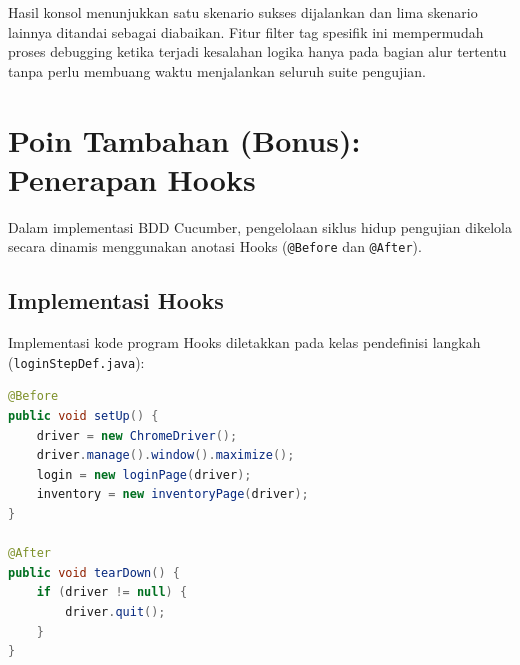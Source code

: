 \documentclass[a4paper,oneside,11pt]{book}
\begin{document}


Hasil konsol menunjukkan satu skenario sukses dijalankan dan lima skenario lainnya ditandai sebagai diabaikan. Fitur filter tag spesifik ini mempermudah proses debugging ketika terjadi kesalahan logika hanya pada bagian alur tertentu tanpa perlu membuang waktu menjalankan seluruh suite pengujian.

\section{Poin Tambahan (Bonus): Penerapan Hooks}
Dalam implementasi BDD Cucumber, pengelolaan siklus hidup pengujian dikelola secara dinamis menggunakan anotasi Hooks (\texttt{@Before} dan \texttt{@After}).

\subsection{Implementasi Hooks}
Implementasi kode program Hooks diletakkan pada kelas pendefinisi langkah (\texttt{loginStepDef.java}):

\begin{lstlisting}[language=Java, caption=Implementasi Hooks pada loginStepDef.java]
@Before
public void setUp() {
    driver = new ChromeDriver();
    driver.manage().window().maximize();
    login = new loginPage(driver);
    inventory = new inventoryPage(driver);
}

@After
public void tearDown() {
    if (driver != null) {
        driver.quit();
    }
}
\end{lstlisting}
\end{document}
